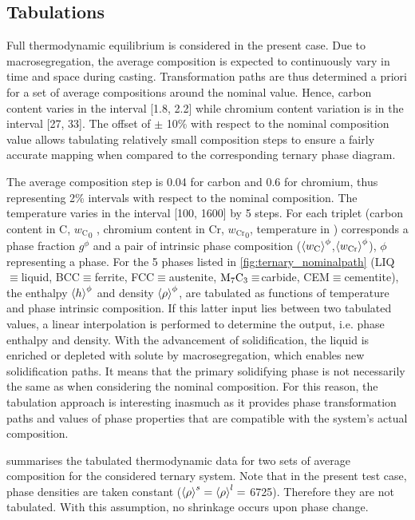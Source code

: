 \subsection{Tabulations}

Full thermodynamic equilibrium is considered in the present case. Due to macrosegregation, 
the average composition is expected to continuously vary in time and space during casting. 
Transformation paths are thus determined a priori for a set of average compositions around 
the nominal value. Hence, carbon content varies in the interval [\SI{1.8}{\ucomposition}, \SI{2.2}{\ucomposition}] 
while chromium content variation is in the interval [\SI{27}{\ucomposition}, \SI{33}{\ucomposition}]. The offset of $\pm$ 10\%  with 
respect to the nominal composition value allows tabulating relatively small composition steps
to ensure a fairly accurate mapping when compared to the corresponding ternary phase diagram. 

The average composition step is \SI{0.04}{\ucomposition} for carbon and \SI{0.6}{\ucomposition} for chromium, thus representing 2\% 
intervals with respect to the nominal composition. The temperature varies in the interval 
[\SI{100}{\udegC}, \SI{1600}{\udegC}] by \SI{5}{\udegC} steps. For each triplet (carbon content 
in \si{\ucomposition} C, ${w_\text{C}}_0$ , chromium content in \si{\ucomposition} Cr,  ${w_\text{Cr}}_0$, temperature in \si{\udegK}) 
corresponds a phase fraction $g^\phi$ and a pair of intrinsic phase composition ($\left \langle w_\text{C} \right \rangle^\phi$,$\left \langle w_\text{Cr} \right \rangle^\phi$), $\phi$ representing a phase. For the 5 
phases listed in \cref{fig:ternary_nominalpath} (LIQ$\equiv$liquid, BCC$\equiv$ferrite, FCC$\equiv$austenite, 
$\text{M}_7 \text{C}_3 \equiv$carbide, CEM$\equiv$cementite), the enthalpy $\left \langle h \right \rangle^{\phi} $ and density $\left \langle \rho \right \rangle^{\phi} $, are tabulated 
as functions of temperature and phase intrinsic composition. If this latter input lies between two tabulated 
values, a linear interpolation is performed to determine the output, i.e. phase enthalpy and density. With 
the advancement of solidification, the liquid is enriched or depleted with solute by macrosegregation, which enables new 
solidification paths. It means that the primary solidifying phase is not necessarily the same as when considering 
the nominal composition. For this reason, the tabulation approach is interesting inasmuch as it provides phase 
transformation paths and values of phase properties that are compatible with the system’s actual composition. 

 summarises the tabulated thermodynamic data for two sets of average composition for the considered 
ternary system. Note that in the present test case, phase densities are taken constant ($\left \langle \rho \right \rangle^s=\left \langle \rho \right \rangle^l=$ \SI{6725}{\udensity}). 
Therefore they are not tabulated. With this assumption, no shrinkage occurs upon phase change.


